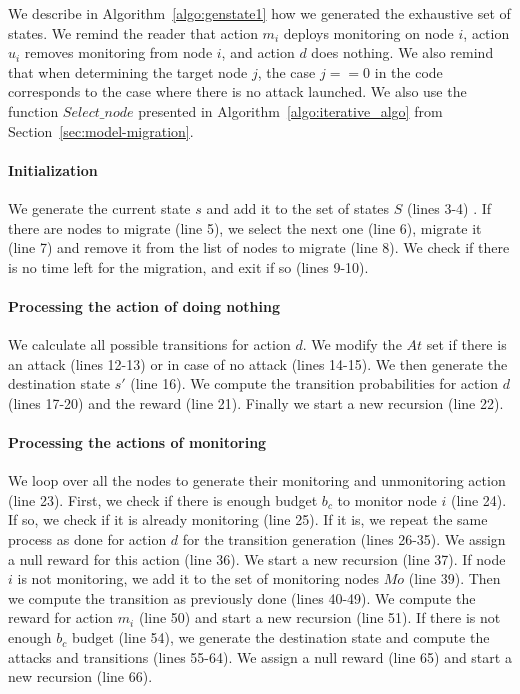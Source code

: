 We describe in Algorithm~\ref{algo:genstate1} how we generated the exhaustive set of states.
We remind the reader that action $m_i$ deploys monitoring on node $i$, action $u_i$ removes monitoring from node $i$, and action $d$ does nothing.
We also remind that when determining the target node $j$, the case $j==0$ in the code corresponds to the case where there is no attack launched.
We also use the function $Select\_node$ presented in Algorithm~\ref{algo:iterative_algo} from Section~\ref{sec:model-migration}.

\paragraph{Initialization}
We generate the current state $s$ and add it to the set of states $S$ (lines 3-4) .
If there are nodes to migrate (line 5), we select the next one (line 6), migrate it (line 7) and remove it from the list of nodes to migrate (line 8).
We check if there is no time left for the migration, and exit if so (lines 9-10).

\paragraph{Processing the action of doing nothing}
We calculate all possible transitions for action $d$.
We modify the $At$ set if there is an attack (lines 12-13) or in case of no attack (lines 14-15).
We then generate the destination state $s'$ (line 16).
We compute the transition probabilities for action $d$ (lines 17-20) and the reward (line 21).
Finally we start a new recursion (line 22).

\paragraph{Processing the actions of monitoring}
We loop over all the nodes to generate their monitoring and unmonitoring action (line 23).
First, we check if there is enough budget $b_c$ to monitor node $i$ (line 24).
If so, we check if it is already monitoring (line 25).
If it is, we repeat the same process as done for action $d$ for the transition generation (lines 26-35).
We assign a null reward for this action (line 36).
We start a new recursion (line 37).
If node $i$ is not monitoring, we add it to the set of monitoring nodes $Mo$ (line 39).
Then we compute the transition as previously done (lines 40-49).
We compute the reward for action $m_i$ (line 50) and start a new recursion (line 51).
If there is not enough $b_c$ budget (line 54), we generate the destination state and compute the attacks and  transitions (lines 55-64).
We assign a null reward (line 65) and start a new recursion (line 66).

